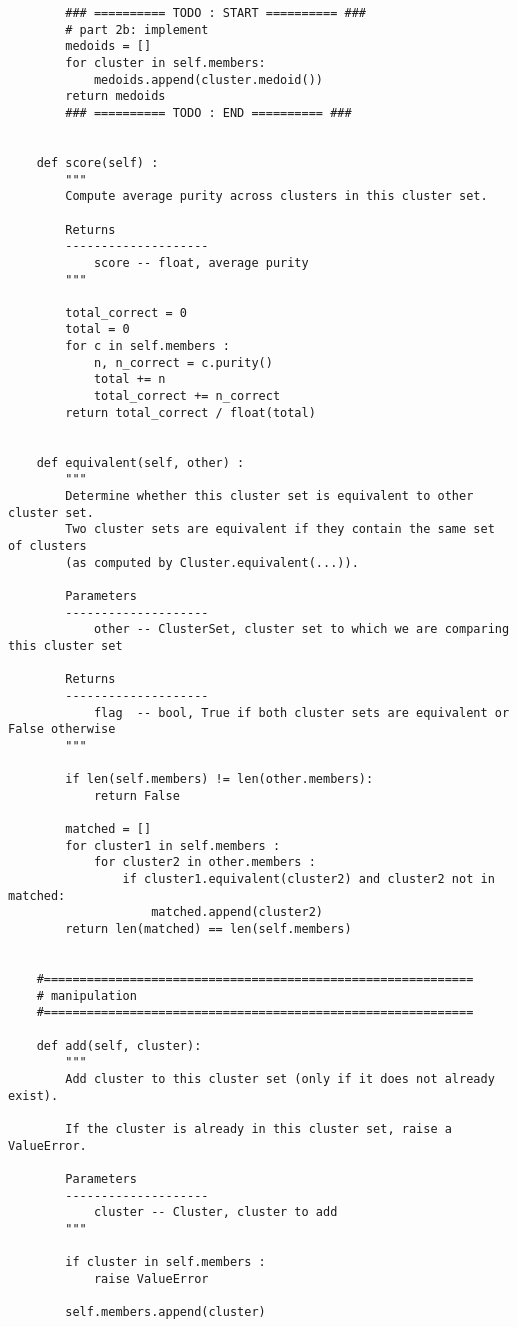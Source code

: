 \documentclass[11pt]{article}
\begin{document}
\begin{verbatim}
        ### ========== TODO : START ========== ###
        # part 2b: implement
        medoids = []
        for cluster in self.members:
            medoids.append(cluster.medoid())
        return medoids
        ### ========== TODO : END ========== ###
    
    
    def score(self) :
        """
        Compute average purity across clusters in this cluster set.
        
        Returns
        --------------------
            score -- float, average purity
        """
        
        total_correct = 0
        total = 0
        for c in self.members :
            n, n_correct = c.purity()
            total += n
            total_correct += n_correct
        return total_correct / float(total)
    
    
    def equivalent(self, other) :
        """ 
        Determine whether this cluster set is equivalent to other cluster set.
        Two cluster sets are equivalent if they contain the same set of clusters
        (as computed by Cluster.equivalent(...)).
        
        Parameters
        --------------------
            other -- ClusterSet, cluster set to which we are comparing this cluster set
        
        Returns
        --------------------
            flag  -- bool, True if both cluster sets are equivalent or False otherwise
        """
        
        if len(self.members) != len(other.members):
            return False
        
        matched = []
        for cluster1 in self.members :
            for cluster2 in other.members :
                if cluster1.equivalent(cluster2) and cluster2 not in matched:
                    matched.append(cluster2)
        return len(matched) == len(self.members)
    
    
    #============================================================
    # manipulation
    #============================================================

    def add(self, cluster):
        """
        Add cluster to this cluster set (only if it does not already exist).
        
        If the cluster is already in this cluster set, raise a ValueError.
        
        Parameters
        --------------------
            cluster -- Cluster, cluster to add
        """
        
        if cluster in self.members :
            raise ValueError
        
        self.members.append(cluster)
\end{verbatim}   
 
\end{document}
